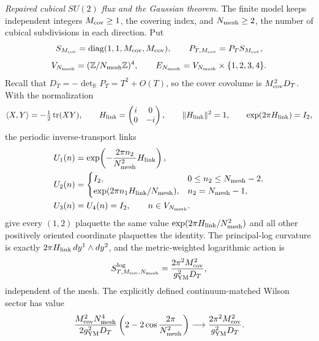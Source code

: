 \documentclass[10pt,letterpaper]{article}
\begin{document}
\medskip\noindent
\textit{Repaired cubical $SU(2)$ flux and the Gaussian theorem.}
The finite model keeps independent integers $M_{\rm cov}\ge1$, the covering
index, and $N_{\rm mesh}\ge2$, the number of cubical subdivisions in each
direction.  Put
\[
 S_{M_{\rm cov}}=\operatorname{diag}(1,1,M_{\rm cov},M_{\rm cov}),
 \qquad P_{T,M_{\rm cov}}=P_TS_{M_{\rm cov}},
\]
\[
 V_{N_{\rm mesh}}=(\mathbb Z/N_{\rm mesh}\mathbb Z)^4,
 \qquad
 E_{N_{\rm mesh}}=V_{N_{\rm mesh}}\times\{1,2,3,4\}.
\]
Recall that $D_T=-\det_{\mathbb R}P_T=T^2+O(T)$, so the cover covolume is
$M_{\rm cov}^2D_T$.  With the normalization
\[
 \langle X,Y\rangle=-\tfrac12\operatorname{tr}(XY),\qquad
 H_{\rm link}=\begin{pmatrix}i&0\\0&-i\end{pmatrix},\qquad
 \lVert H_{\rm link}\rVert^2=1,\qquad
 \exp(2\pi H_{\rm link})=I_2,
\]
the periodic inverse-transport links
\[
 \begin{aligned}
 U_1(n)
 &=\exp\!\left(-\frac{2\pi n_2}{N_{\rm mesh}^2}
 H_{\rm link}\right),\\
 U_2(n)
 &=
 \begin{cases}
  I_2,&0\le n_2\le N_{\rm mesh}-2,\\
  \exp(2\pi n_1H_{\rm link}/N_{\rm mesh}),
      &n_2=N_{\rm mesh}-1,
 \end{cases}\\
 U_3(n)&=U_4(n)=I_2,
 \qquad n\in V_{N_{\rm mesh}}.
 \end{aligned}
\]
give every $(1,2)$ plaquette the same value
$\exp(2\pi H_{\rm link}/N_{\rm mesh}^2)$ and all other positively oriented coordinate
plaquettes the identity.  The principal-log curvature is exactly
$2\pi H_{\rm link}\,dy^1\wedge dy^2$, and the metric-weighted logarithmic action is
\[
 S^{\log}_{T,M_{\rm cov},N_{\rm mesh}}
 =\frac{2\pi^2M_{\rm cov}^2}{g_{\rm YM}^2D_T},
\]
independent of the mesh.  The explicitly defined continuum-matched Wilson
sector has value
\[
 \frac{M_{\rm cov}^2N_{\rm mesh}^4}{2g_{\rm YM}^2D_T}
 \left(2-2\cos\frac{2\pi}{N_{\rm mesh}^2}\right)
 \longrightarrow
 \frac{2\pi^2M_{\rm cov}^2}{g_{\rm YM}^2D_T}.
\]
\end{document}
